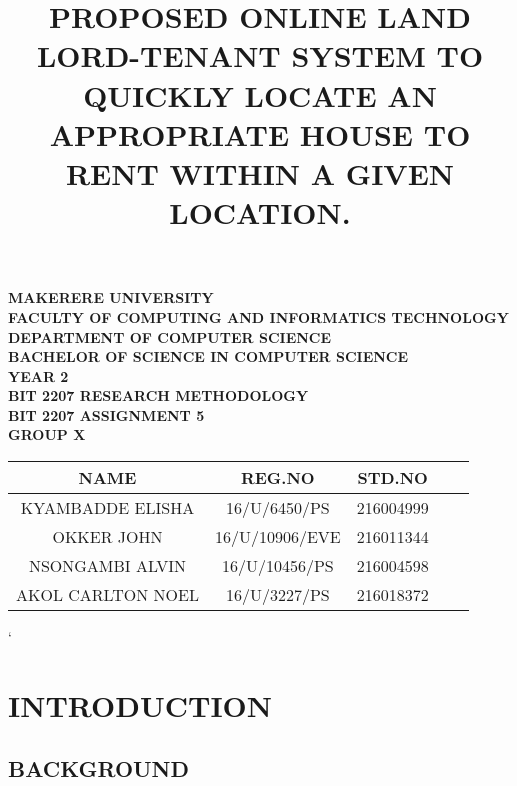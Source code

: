 \documentclass[a4paper,12pt]{article}
\begin{document}
\begin{Huge}
\begin{center}
\begin{normalsize}

\textbf{MAKERERE UNIVERSITY } \\
\textbf{FACULTY OF COMPUTING AND INFORMATICS TECHNOLOGY} \\
\textbf{DEPARTMENT OF COMPUTER SCIENCE} \\
\textbf{BACHELOR OF SCIENCE IN COMPUTER SCIENCE} \\
\textbf{YEAR 2} \\
\textbf{BIT 2207 RESEARCH METHODOLOGY} \\
\textbf{BIT 2207 ASSIGNMENT 5} \\
\textbf{GROUP X} \\
\vspace{1cm}


\begin{tabular}{|c|c|c|c|c|}
\hline
NAME & REG.NO& STD.NO \\ [2ex]
\hline
KYAMBADDE ELISHA  & 16/U/6450/PS & 216004999 \\ [2ex]
\hline
OKKER JOHN & 16/U/10906/EVE & 216011344 \\ [2ex]
\hline
 NSONGAMBI ALVIN & 16/U/10456/PS & 216004598 \\ [2ex]
\hline
AKOL CARLTON NOEL & 16/U/3227/PS & 216018372 \\ [2ex]
\hline

\end{tabular}


\end{normalsize}
\end{center}
\end{Huge}
\newpage

\title{PROPOSED ONLINE LAND LORD-TENANT SYSTEM TO QUICKLY LOCATE AN APPROPRIATE HOUSE TO RENT WITHIN A GIVEN LOCATION.}
\maketitle    


\begin{center}

\end{center}`
\section{INTRODUCTION}
\subsection{BACKGROUND}
\end{document}
